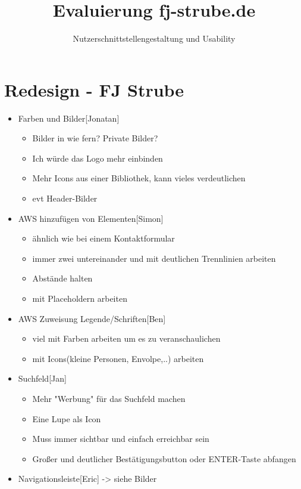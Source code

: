 \documentclass{scrartcl}
\title{Evaluierung fj-strube.de}
\subtitle{Nutzerschnittstellen\-gestaltung und Usability}
\author{Jan Brose\texorpdfstring{\strut\\}{, }
Simon Retsch\texorpdfstring{\strut\\}{, }
Eric Schmidtgen\texorpdfstring{\strut\\}{, }
Ben Schönherr\texorpdfstring{\strut\\}{, }
Falk-Jonatan Strube}
\begin{document}
\section*{Redesign - FJ Strube}
\begin{itemize}
	\item Farben und Bilder[Jonatan]
		\begin{itemize}
			\item Bilder in wie fern? Private Bilder?
			\item Ich würde das Logo mehr einbinden
			\item Mehr Icons aus einer Bibliothek, kann vieles verdeutlichen
			\item evt Header-Bilder
		\end{itemize}
	\item AWS hinzufügen von Elementen[Simon]
		\begin{itemize}
			\item ähnlich wie bei einem Kontaktformular
			\item immer zwei untereinander und mit deutlichen Trennlinien arbeiten
			\item Abstände halten
			\item mit Placeholdern arbeiten
		\end{itemize}
	\item AWS Zuweisung Legende/Schriften[Ben]
		\begin{itemize}
			\item viel mit Farben arbeiten um es zu veranschaulichen
			\item mit Icons(kleine Personen, Envolpe,..) arbeiten
		\end{itemize}
	\item Suchfeld[Jan]
		\begin{itemize}
			\item Mehr "Werbung" für das Suchfeld machen
			\item Eine Lupe als Icon
			\item Muss immer sichtbar und einfach erreichbar sein
			\item Großer und deutlicher Bestätigungsbutton oder ENTER-Taste abfangen
		\end{itemize}
	\item Navigationsleiste[Eric] -> siehe Bilder
	
\end{itemize}
\end{document}
